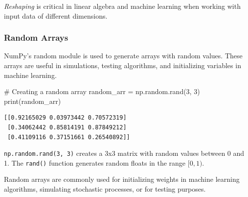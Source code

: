 \documentclass[
  letterpaper,
  DIV=11,
  numbers=noendperiod]{scrreprt}
\newenvironment{Shaded}{\begin{snugshade}}{\end{snugshade}}
\newcommand{\BuiltInTok}[1]{\textcolor[rgb]{0.00,0.23,0.31}{#1}}
\newcommand{\CommentTok}[1]{\textcolor[rgb]{0.37,0.37,0.37}{#1}}
\newcommand{\DecValTok}[1]{\textcolor[rgb]{0.68,0.00,0.00}{#1}}
\newcommand{\NormalTok}[1]{\textcolor[rgb]{0.00,0.23,0.31}{#1}}
\newcommand{\OperatorTok}[1]{\textcolor[rgb]{0.37,0.37,0.37}{#1}}
\theoremstyle{plain}
\theoremstyle{definition}
\theoremstyle{remark}
\begin{document}
\begin{tcolorbox}[enhanced jigsaw, leftrule=.75mm, bottomtitle=1mm, colback=white, toptitle=1mm, opacitybacktitle=0.6, toprule=.15mm, colbacktitle=quarto-callout-note-color!10!white, arc=.35mm, colframe=quarto-callout-note-color-frame, title=\textcolor{quarto-callout-note-color}{\faInfo}\hspace{0.5em}{Use:}, titlerule=0mm, rightrule=.15mm, left=2mm, bottomrule=.15mm, breakable, coltitle=black, opacityback=0]

\emph{Reshaping} is critical in linear algebra and machine learning when
working with input data of different dimensions.

\end{tcolorbox}

\subsubsection{Random Arrays}\label{random-arrays}

NumPy's random module is used to generate arrays with random values.
These arrays are useful in simulations, testing algorithms, and
initializing variables in machine learning.

\begin{Shaded}
\begin{Highlighting}[]
\CommentTok{\# Creating a random array}
\NormalTok{random\_arr }\OperatorTok{=}\NormalTok{ np.random.rand(}\DecValTok{3}\NormalTok{, }\DecValTok{3}\NormalTok{)}
\BuiltInTok{print}\NormalTok{(random\_arr)}
\end{Highlighting}
\end{Shaded}

\begin{verbatim}
[[0.92165029 0.03973442 0.70572319]
 [0.34062442 0.85814191 0.87849212]
 [0.41109116 0.37151661 0.26540892]]
\end{verbatim}

\texttt{np.random.rand(3,\ 3)} creates a 3x3 matrix with random values
between 0 and 1. The \texttt{rand()} function generates random floats in
the range \([0, 1)\).

\begin{tcolorbox}[enhanced jigsaw, leftrule=.75mm, bottomtitle=1mm, colback=white, toptitle=1mm, opacitybacktitle=0.6, toprule=.15mm, colbacktitle=quarto-callout-note-color!10!white, arc=.35mm, colframe=quarto-callout-note-color-frame, title=\textcolor{quarto-callout-note-color}{\faInfo}\hspace{0.5em}{Use:}, titlerule=0mm, rightrule=.15mm, left=2mm, bottomrule=.15mm, breakable, coltitle=black, opacityback=0]

Random arrays are commonly used for initializing weights in machine
learning algorithms, simulating stochastic processes, or for testing
purposes.

\end{tcolorbox}
\end{document}
